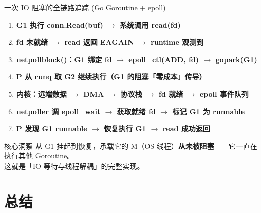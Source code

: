 \begin{frame}{一次 IO 阻塞的全链路追踪 (Go Goroutine + epoll)}
  \vspace{-0.3em}
  \begin{enumerate}
    \setlength{\itemsep}{0.4em}
    \item \textbf{G1 执行 conn.Read(buf) $\rightarrow$ 系统调用 read(fd)}
    \item \textbf{fd 未就绪 $\rightarrow$ read 返回 EAGAIN $\rightarrow$ runtime 观测到}
    \item \textbf{netpollblock()：G1 绑定 fd $\rightarrow$ epoll\_ctl(ADD, fd) $\rightarrow$ gopark(G1)}
    \item \textcolor{corGreen}{\textbf{P 从 runq 取 G2 继续执行（G1 的阻塞「零成本」传导）}}
    \item \textbf{内核：远端数据 $\rightarrow$ DMA $\rightarrow$ 协议栈 $\rightarrow$ fd 就绪 $\rightarrow$ epoll 事件队列}
    \item \textbf{netpoller 调 epoll\_wait $\rightarrow$ 获取就绪 fd $\rightarrow$ 标记 G1 为 runnable}
    \item \textcolor{corGreen}{\textbf{P 发现 G1 runnable $\rightarrow$ 恢复执行 G1 $\rightarrow$ read 成功返回}}
  \end{enumerate}

  \vspace{0.5em}
  \begin{alertblock}{核心洞察}
    \centering
    从 G1 挂起到恢复，承载它的 M（OS 线程）\textbf{从未被阻塞}——它一直在执行其他 Goroutine。\\
    这就是「IO 等待与线程解耦」的完整实现。
  \end{alertblock}
\end{frame}

\section{总结}

